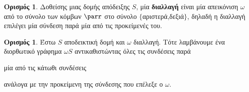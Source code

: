 \documentclass [a4paper,11pt] {book}
\theoremstyle{definition}
\theoremstyle{definition}
\newtheorem{definition}[theorem]{Ορισμός}
\begin{document}
\begin{definition}
Δοθείσης μιας δομής απόδειξης $S$, μία \textbf{διαλλαγή} είναι μία απεικόνιση $\omega$ από το σύνολο των κόμβων $\parr$ στο σύνολο $\{$αριστερά,δεξιά$\}$, δηλαδή η διαλλαγή επιλέγει μία σύνδεση παρά μία από τις προκείμενές του.
\end{definition}
\begin{definition}
Έστω $S$ αποδεικτική δομή και $\omega$ διαλλαγή. Τότε λαμβάνουμε ένα διορθωτικό γράφημα $\omega S$ αντικαθιστώντας όλες τις συνδέσεις παρά
\begin{center}
\end{center}
μία από τις κάτωθι συνδέσεις
\begin{center}
\end{center}
ανάλογα με την προκείμενη της σύνδεσης που επέλεξε ο $\omega$.
\end{definition}
\end{document}
